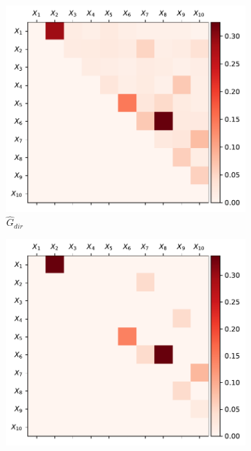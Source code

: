\documentclass[../Thesis.tex]{subfiles}
\begin{document}
\newpage
\begin{figure}[H]
    \centering
    \begin{subfigure}[t]{0.49\linewidth}
        \includegraphics[width = \linewidth]{figures/ND examples/Gaussian network 10 - G_dir - triangular.pdf}
        \caption{$\hat{G}_{dir}$}
    \end{subfigure}
    \hfill
    \begin{subfigure}[t]{0.49\linewidth}
        \includegraphics[width = \linewidth]{figures/ND examples/Gaussian network 10 - G_dir true - triangular.pdf}

\end{subfigure}
\end{figure}
\end{document}
